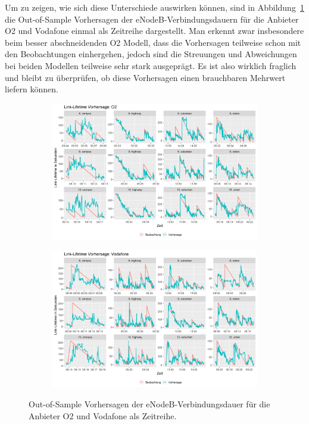 Um zu zeigen, wie sich diese Unterschiede auswirken k\"onnen, sind in Abbildung~\ref{fig:link-lifetime-zeitreihe} die Out-of-Sample
Vorhersagen der eNodeB-Verbindungsdauern f\"ur die Anbieter O2 und Vodafone einmal als Zeitreihe dargestellt.
Man erkennt zwar insbesondere beim besser abschneidenden O2 Modell, dass die Vorhersagen teilweise schon mit den Beobachtungen
einhergehen, jedoch sind die Streuungen und Abweichungen bei beiden Modellen teilweise sehr stark ausgepr\"agt.
Es ist also wirklich fraglich und bleibt zu \"uberpr\"ufen, ob diese Vorhersagen einen brauchbaren Mehrwert liefern k\"onnen.
\begin{figure}
\centering
\begin{subfigure}{\textwidth}
    \centering
    \includegraphics[width=\textwidth]{abbildungen/link_lifetime_o2}
\end{subfigure}
\begin{subfigure}{\textwidth}
    \centering
    \includegraphics[width=\textwidth]{abbildungen/link_lifetime_vodafone}
\end{subfigure}
\caption{Out-of-Sample Vorhersagen der eNodeB-Verbindungsdauer f\"ur die Anbieter O2 und Vodafone als Zeitreihe.}
\label{fig:link-lifetime-zeitreihe}
\end{figure}

